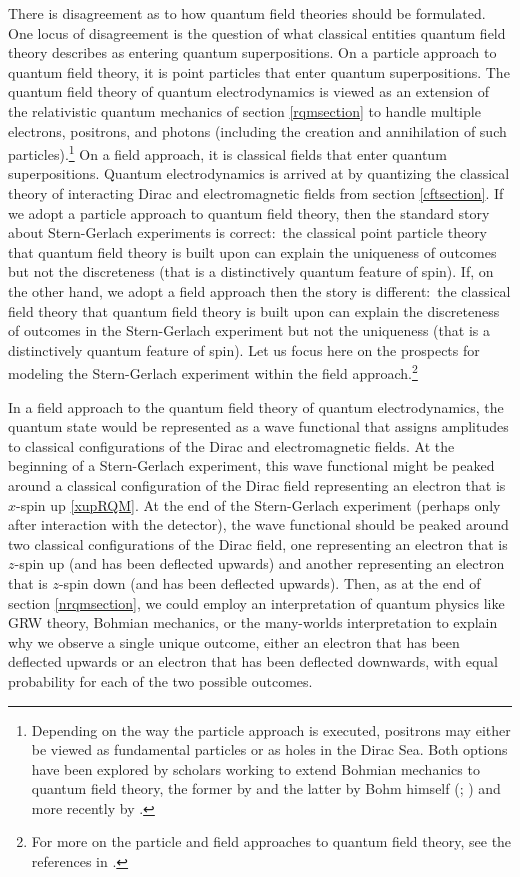 \documentclass[onecolumn,secnumarabic,amsmath,amssymb,balancelastpage,nofootinbib]{article}
\begin{document}
There is disagreement as to how quantum field theories should be formulated.  One locus of disagreement is the question of what classical entities quantum field theory describes as entering quantum superpositions.  On a particle approach to quantum field theory, it is point particles that enter quantum superpositions.  The quantum field theory of quantum electrodynamics is viewed as an extension of the relativistic quantum mechanics of section \ref{rqmsection} to handle multiple electrons, positrons, and photons (including the creation and annihilation of such particles).\footnote{Depending on the way the particle approach is executed, positrons may either be viewed as fundamental particles or as holes in the Dirac Sea.  Both options have been explored by scholars working to extend Bohmian mechanics to quantum field theory, the former by \citet{durr2004, durr2005} and the latter by Bohm himself (\citealp[pg.\ 275]{bohm1953}; \citealp[ch.\ 12]{bohmhiley}) and more recently by \citet{colin2007, deckert2019}.}  On a field approach, it is classical fields that enter quantum superpositions.  Quantum electrodynamics is arrived at by quantizing the classical theory of interacting Dirac and electromagnetic fields from section \ref{cftsection}.  If we adopt a particle approach to quantum field theory, then the standard story about Stern-Gerlach experiments is correct:\ the classical point particle theory that quantum field theory is built upon can explain the uniqueness of outcomes but not the discreteness (that is a distinctively quantum feature of spin).  If, on the other hand, we adopt a field approach then the story is different:\ the classical field theory that quantum field theory is built upon can explain the discreteness of outcomes in the Stern-Gerlach experiment but not the uniqueness (that is a distinctively quantum feature of spin).  Let us focus here on the prospects for modeling the Stern-Gerlach experiment within the field approach.\footnote{For more on the particle and field approaches to quantum field theory, see the references in \citet[footnote 2]{howelectronsspin}.}


In a field approach to the quantum field theory of quantum electrodynamics, the quantum state would be represented as a wave functional that assigns amplitudes to classical configurations of the Dirac and electromagnetic fields.  At the beginning of a Stern-Gerlach experiment, this wave functional might be peaked around a classical configuration of the Dirac field representing an electron that is $x$-spin up \eqref{xupRQM}.  At the end of the Stern-Gerlach experiment (perhaps only after interaction with the detector), the wave functional should be peaked around two classical configurations of the Dirac field, one representing an electron that is $z$-spin up (and has been deflected upwards) and another representing an electron that is $z$-spin down (and has been deflected upwards).  Then, as at the end of section \ref{nrqmsection}, we could employ an interpretation of quantum physics like GRW theory, Bohmian mechanics, or the many-worlds interpretation to explain why we observe a single unique outcome, either an electron that has been deflected upwards or an electron that has been deflected downwards, with equal probability for each of the two possible outcomes.
\end{document}

